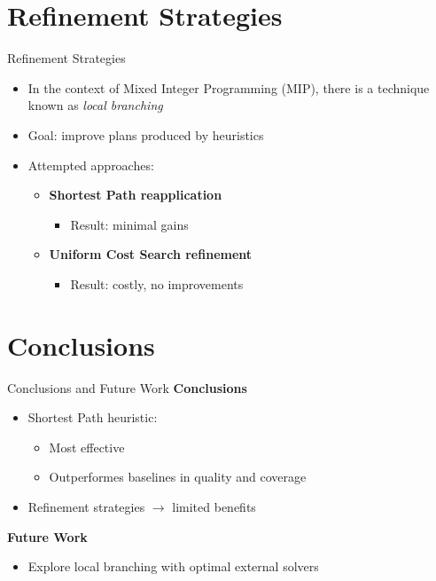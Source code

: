\documentclass[aspectratio=169,xcolor=dvipsnames]{beamer}
\begin{document}
\section{Refinement Strategies}

\begin{frame}{Refinement Strategies}
	\begin{itemize}
		\item In the context of Mixed Integer Programming (MIP), there is a technique known as \textit{local branching}
		\item Goal: improve plans produced by heuristics
		\item Attempted approaches:
		      \begin{itemize}
			      \item \textbf{Shortest Path reapplication}
			            \begin{itemize}
				            \item Result: minimal gains
			            \end{itemize}
			      \item \textbf{Uniform Cost Search refinement}
			            \begin{itemize}
				            \item Result: costly, no improvements
			            \end{itemize}

		      \end{itemize}
	\end{itemize}
\end{frame}

\section{Conclusions}

\begin{frame}{Conclusions and Future Work}
	\textbf{Conclusions}
	\begin{itemize}
		\item Shortest Path heuristic:
		      \begin{itemize}
			      \item Most effective
			      \item Outperformes baselines in quality and coverage
		      \end{itemize}
		\item Refinement strategies $\rightarrow$ limited benefits
	\end{itemize}
	\textbf{Future Work}
	\begin{itemize}
		\item Explore local branching with optimal external solvers
	\end{itemize}
\end{frame}

\end{document}

